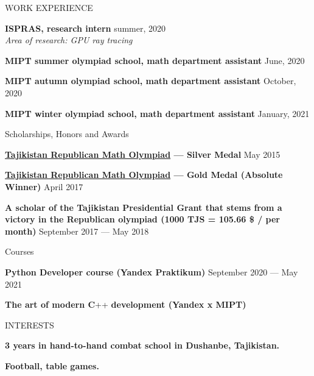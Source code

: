\documentclass{resume}
\begin{document}



\begin{rSection}{WORK EXPERIENCE} \itemsep -1pt {}  

\item \textbf{ISPRAS, research intern} \hfill summer, 2020 \\
\textit{Area of research: GPU ray tracing}

\item \textbf{MIPT summer olympiad school, math department assistant} \hfill June, 2020 
\item \textbf{MIPT autumn olympiad school, math department assistant} \hfill October, 2020 
\item \textbf{MIPT winter olympiad school, math department assistant} \hfill January, 2021 
\textit{}
\end{rSection}

\begin{rSection}{Scholarships, Honors and Awards} \itemsep -1pt {}  

\item \textbf{\href{http://mri.tj/?page_id=124}{\underline{Tajikistan Republican Math Olympiad}} --- Silver Medal} \hfill May 2015
\item \textbf{\href{http://mri.tj/?page_id=124}{\underline{Tajikistan Republican Math Olympiad}} --- Gold Medal (Absolute Winner)} \hfill April 2017
\item {\textbf{A scholar of the Tajikistan Presidential Grant that stems from a victory in the Republican olympiad (1000 TJS = 105.66 \$ / per month)}} \hfill September 2017 --- May 2018
\end{rSection}

\begin{rSection}{Courses} \itemsep -1pt {}
\item {\textbf{Python Developer course (Yandex Praktikum)}} \hfill September 2020 --- May 2021
\item {\textbf{The art of modern C}}++ \textbf{development (Yandex x MIPT)}
\end{rSection}

\begin{rSection}{INTERESTS}
\item \textbf{3 years in hand-to-hand combat school in Dushanbe, Tajikistan.}
\item \textbf{Football,  table games.}
\end{rSection}
\end{document}
